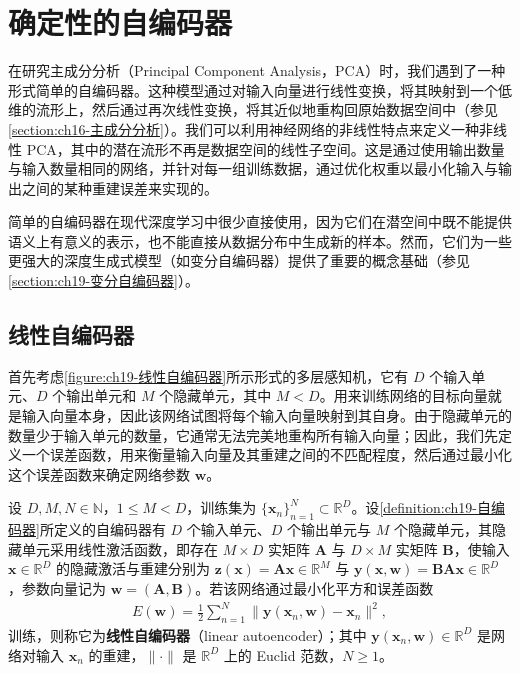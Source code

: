 \documentclass[../../main.tex]{subfiles}
\begin{document}
\section{确定性的自编码器}\label{section:ch19-确定性自编码器}

在研究主成分分析（Principal Component Analysis，PCA）时，我们遇到了一种形式简单的自编码器。这种模型通过对输入向量进行线性变换，将其映射到一个低维的流形上，然后通过再次线性变换，将其近似地重构回原始数据空间中（参见\cref{section:ch16-主成分分析}）。我们可以利用神经网络的非线性特点来定义一种非线性 PCA，其中的潜在流形不再是数据空间的线性子空间。这是通过使用输出数量与输入数量相同的网络，并针对每一组训练数据，通过优化权重以最小化输入与输出之间的某种重建误差来实现的。

简单的自编码器在现代深度学习中很少直接使用，因为它们在潜空间中既不能提供语义上有意义的表示，也不能直接从数据分布中生成新的样本。然而，它们为一些更强大的深度生成式模型（如变分自编码器）提供了重要的概念基础（参见\cref{section:ch19-变分自编码器}）。

\subsection{线性自编码器}\label{subsection:ch19-线性自编码器}

首先考虑\cref{figure:ch19-线性自编码器}所示形式的多层感知机，它有 $D$ 个输入单元、$D$ 个输出单元和 $M$ 个隐藏单元，其中 $M<D$。用来训练网络的目标向量就是输入向量本身，因此该网络试图将每个输入向量映射到其自身。由于隐藏单元的数量少于输入单元的数量，它通常无法完美地重构所有输入向量；因此，我们先定义一个误差函数，用来衡量输入向量及其重建之间的不匹配程度，然后通过最小化这个误差函数来确定网络参数 $\bm{w}$。

\begin{definition}[线性自编码器]\label{definition:ch19-线性自编码器}
设 $D,M,N\in\mathbb{N}$，$1\leqslant M<D$，训练集为 $\{\bm{x}_{n}\}_{n=1}^{N}\subset\mathbb{R}^{D}$。设\cref{definition:ch19-自编码器}所定义的自编码器有 $D$ 个输入单元、$D$ 个输出单元与 $M$ 个隐藏单元，其隐藏单元采用线性激活函数，即存在 $M\times D$ 实矩阵 $\bm{A}$ 与 $D\times M$ 实矩阵 $\bm{B}$，使输入 $\bm{x}\in\mathbb{R}^{D}$ 的隐藏激活与重建分别为 $\bm{z}(\bm{x})=\bm{A}\bm{x}\in\mathbb{R}^{M}$ 与 $\bm{y}(\bm{x},\bm{w})=\bm{B}\bm{A}\bm{x}\in\mathbb{R}^{D}$，参数向量记为 $\bm{w}=(\bm{A},\bm{B})$。若该网络通过最小化平方和误差函数
\begin{align}
E(\bm{w})=\frac{1}{2}\sum_{n=1}^{N}\big\|\bm{y}(\bm{x}_n,\bm{w})-\bm{x}_n\big\|^{2},
\label{align:ch19-平方和误差}
\end{align}
训练，则称它为\textbf{线性自编码器}（linear autoencoder）；其中 $\bm{y}(\bm{x}_{n},\bm{w})\in\mathbb{R}^{D}$ 是网络对输入 $\bm{x}_{n}$ 的重建，$\|\cdot\|$ 是 $\mathbb{R}^{D}$ 上的 Euclid 范数，$N\geqslant1$。
\end{definition}
\end{document}
